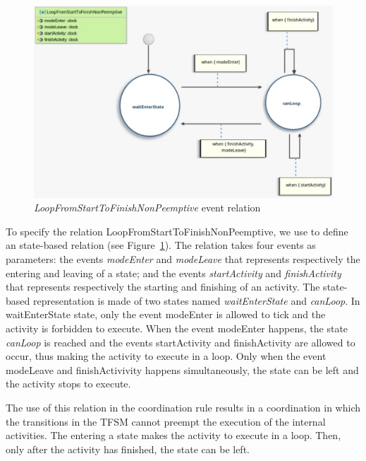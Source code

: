 \begin{figure}
	\center
	\includegraphics[width=.7\columnwidth]{examples/figs/LoopFromStartToFinishNonPreemptive}
	\caption{\emph{LoopFromStartToFinishNonPeemptive} event relation}
	\label{fig:looprelation}
\end{figure}

To specify the relation LoopFromStartToFinishNonPeemptive, we use \moccml to define an state-based relation (see Figure~\ref{fig:looprelation}). The relation takes four events as parameters: the events \emph{modeEnter} and \emph{modeLeave} that represents respectively the entering and leaving of a state; and the events \emph{startActivity} and \emph{finishActivity} that represents respectively the starting and finishing of an activity. The state-based representation is made of two states named \emph{waitEnterState} and \emph{canLoop}. In waitEnterState state, only the event modeEnter is allowed to tick and the activity is forbidden to execute. When the event modeEnter happens, the state \emph{canLoop} is reached and the events startActivity and finishActivity are allowed to occur, thus making the activity to execute in a loop. Only when the event modeLeave and finishActivivity happens simultaneously, the state can be left and the activity stops to execute. 

The use of this relation in the coordination rule results in a coordination in which the transitions in the TFSM cannot preempt the execution of the internal activities. The entering a state makes the activity to execute in a loop. Then, only after the activity has finished, the state can be left.


